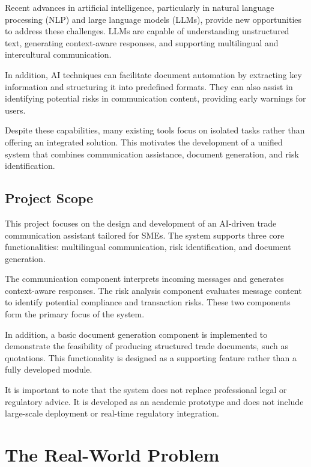 \documentclass[12pt,a4paper]{report}
\begin{document}
Recent advances in artificial intelligence, particularly in natural language processing (NLP) and large language models (LLMs), provide new opportunities to address these challenges. LLMs are capable of understanding unstructured text, generating context-aware responses, and supporting multilingual and intercultural communication.

In addition, AI techniques can facilitate document automation by extracting key information and structuring it into predefined formats. They can also assist in identifying potential risks in communication content, providing early warnings for users.

Despite these capabilities, many existing tools focus on isolated tasks rather than offering an integrated solution. This motivates the development of a unified system that combines communication assistance, document generation, and risk identification.

\section{Project Scope}

This project focuses on the design and development of an AI-driven trade communication assistant tailored for SMEs. The system supports three core functionalities: multilingual communication, risk identification, and document generation.

The communication component interprets incoming messages and generates context-aware responses. The risk analysis component evaluates message content to identify potential compliance and transaction risks. These two components form the primary focus of the system.

In addition, a basic document generation component is implemented to demonstrate the feasibility of producing structured trade documents, such as quotations. This functionality is designed as a supporting feature rather than a fully developed module.

It is important to note that the system does not replace professional legal or regulatory advice. It is developed as an academic prototype and does not include large-scale deployment or real-time regulatory integration.


\chapter{The Real-World Problem}
\end{document}
